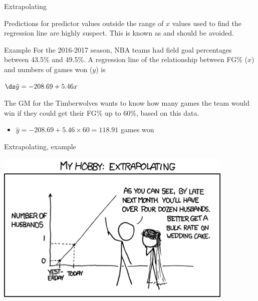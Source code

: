 \documentclass[xcolor=table, handout]{beamer}
\begin{document}
\begin{frame}{Extrapolating}
\begin{block}{}
\large
Predictions for predictor values outside the range of $x$ values used to find the regression line are highly suspect. This is known as  and should be avoided.
\end{block}

\pause
\begin{exampleblock}{Example}
\large
For the 2016-2017 season, NBA teams had field goal percentages between 43.5\% and 49.5\%. A regression line of the relationship between FG\% ($x$) and numbers of games won ($y$) is  \\
\smallskip
{\centering
$\ds \hat y = -208.69 + 5.46 x$
\par}
\smallskip
The GM for the Timberwolves wants to know how many games the team would win if they could get their FG\% up to 60\%, based on this data.
\begin{itemize}
\pause\item $\hat y = -208.69 + 5.46 \times 60 = 118.91$ games won
\end{itemize}

\end{exampleblock}

\end{frame}

\begin{frame}{Extrapolating, example}

{\centering
\includegraphics[width=4.5in]{../images/ch10_extrapolating}
\par}
\end{frame}
\end{document}
